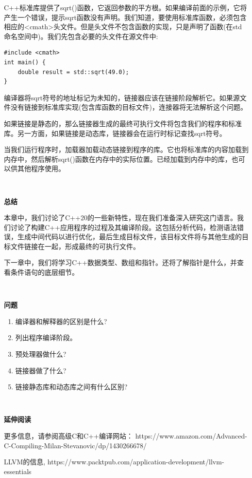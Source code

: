 C++标准库提供了sqrt()函数，它返回参数的平方根。如果编译前面的示例，它将产生一个错误，提示sqrt函数没有声明。我们知道，要使用标准库函数，必须包含相应的<cmath>头文件。但是头文件不包含函数的实现，只是声明了函数(在std命名空间中)。我们先包含必要的头文件在源文件中: \par

\begin{lstlisting}[caption={}]
#include <cmath>
int main() {
	double result = std::sqrt(49.0);
}
\end{lstlisting}

编译器将sqrt符号的地址标记为未知的，链接器应该在链接阶段解析它。如果源文件没有链接到标准库实现(包含库函数的目标文件)，连接器将无法解析这个问题。 \par
如果链接是静态的，那么链接器生成的最终可执行文件将包含我们的程序和标准库。另一方面，如果链接是动态库，链接器会在运行时标记查找sqrt符号。 \par
当我们运行程序时，加载器加载动态链接到程序的库。它也将标准库的内容加载到内存中，然后解析sqrt()函数在内存中的实际位置。已经加载到内存中的库，也可以供其他程序使用。 \par

\noindent\textbf{}\ \par
\textbf{总结}\ \par
本章中，我们讨论了C++20的一些新特性，现在我们准备深入研究这门语言。我们讨论了构建C++应用程序的过程及其编译阶段。这包括分析代码，检测语法错误，生成中间代码以进行优化，最后生成目标文件，该目标文件将与其他生成的目标文件链接在一起，形成最终的可执行文件。 \par
下一章中，我们将学习C++数据类型、数组和指针。还将了解指针是什么，并查看条件语句的底层细节。\par

\noindent\textbf{}\ \par
\textbf{问题}\ \par
\begin{enumerate}
	\item 编译器和解释器的区别是什么?
	\item 列出程序编译阶段。
	\item 预处理器做什么?
	\item 链接器做了什么?
	\item 链接静态库和动态库之间有什么区别?
\end{enumerate}

\noindent\textbf{}\ \par
\textbf{延伸阅读}\ \par
更多信息，请参阅高级C和C++编译网站： https:/​/​www.​amazon.​com/Advanced-​C-​Compiling-​Milan-​Stevanovic/​dp/​1430266678/​\par
LLVM的信息, https://www.packtpub.com/application-development/llvm-essentials \par






























